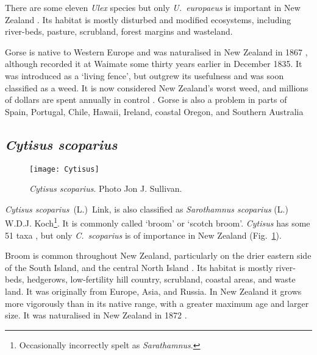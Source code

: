 There are some eleven \emph{Ulex} species but only
\emph{U.~europaeus} is important in New Zealand \citep{ILDIS}. Its
habitat is mostly disturbed and modified ecosystems, including
river-beds, pasture, scrubland, forest margins and wasteland.

Gorse is native to Western Europe and was naturalised in New Zealand
in 1867 \citep{Bellingham04}, although \citeauthor{Darwin09}
recorded it at Waimate some thirty years earlier in December 1835.
It was introduced as a `living fence', but outgrew its usefulness
and was soon classified as a weed. It is now considered New
Zealand's worst weed, and millions of dollars are spent annually in
control \citep{Hill86}. Gorse is also a problem in parts of Spain,
Portugal, Chile, Hawaii, Ireland, coastal Oregon, and Southern
Australia \citep{Roy04,Leary06}



\subsection{\emph{Cytisus scoparius}}


\begin{figure} [tb]
    \centering
    \texttt{[image: Cytisus]}
    \caption[\emph{Cytisus scoparius}]{\emph{Cytisus scoparius}. Photo \cc Jon J. Sullivan.}
    \label{p-Cytisus}
\end{figure}

\emph{Cytisus scoparius}~(L.)~Link, is also classified as
\emph{Sarothamnus scoparius} (L.) W.D.J. Koch\footnote{Occasionally
incorrectly spelt as \emph{Sarathamnus}.}. It is commonly called
`broom' or `scotch broom'. \emph{Cytisus} has some 51 taxa
\citep{ILDIS}, but only \emph{C.~scoparius} is of importance in New
Zealand (Fig.~\ref{p-Cytisus}).

Broom is common throughout New Zealand, particularly on the drier
eastern side of the South Island, and the central North Island
\citep{Fowler00}. Its habitat is mostly river-beds, hedgerows,
low-fertility hill country, scrubland, coastal areas, and waste
land. It was originally from Europe, Asia, and Russia. In New
Zealand it grows more vigorously than in its native range, with a
greater maximum age and larger size. It was naturalised in New
Zealand in 1872 \citep{Bellingham04}.

